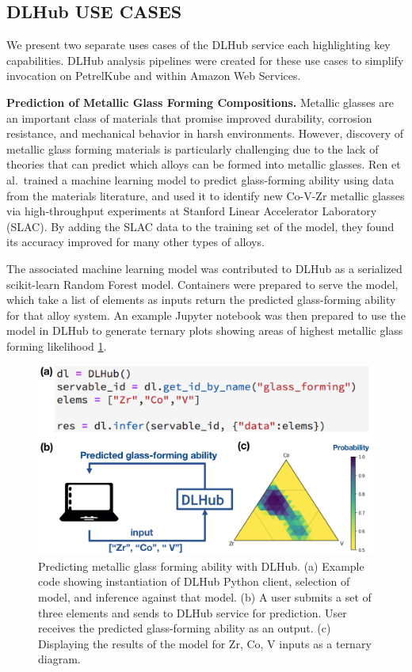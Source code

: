 \documentclass{aip-cp}
\begin{document}
\subsection{DLHub USE CASES}
We present two separate uses cases of the DLHub service each highlighting
key capabilities. DLHub analysis pipelines were created for these
use cases to simplify invocation on PetrelKube and within Amazon Web Services.

\textbf{Prediction of Metallic Glass Forming Compositions.}
Metallic glasses are an important class of materials that promise
improved durability, corrosion resistance, and mechanical behavior in harsh
environments. However, discovery of metallic glass forming materials is
particularly challenging due to the lack of theories that can predict which
alloys can be formed into metallic glasses. Ren et al.\ 
trained a machine learning model to predict glass-forming ability using data 
from the materials literature, and used it to identify new Co-V-Zr metallic glasses
via high-throughput experiments at Stanford Linear Accelerator
Laboratory (SLAC). By adding the SLAC data to the training set of the model,
they found its accuracy improved for many other types of alloys.

The associated machine learning model was contributed to DLHub as a
serialized scikit-learn Random Forest model. Containers were prepared to serve the
model, which take a list of elements as inputs return the predicted glass-forming ability
for that alloy system. An example Jupyter notebook was then prepared to use the model in DLHub 
to generate ternary plots showing areas of highest metallic glass forming likelihood \ref{fig:dlhub-glass}.

\begin{figure}[h]
  \centerline{\includegraphics[width=5in]{Figs/DLHub-metallic-glass.png}}
  \caption{Predicting metallic glass forming ability with DLHub. (a) Example code showing instantiation of DLHub Python client, selection of model, and inference against that model. (b) A user submits a set of three elements and sends to DLHub service for prediction. User receives the predicted glass-forming ability as an output. (c) Displaying the results of the model for Zr, Co, V inputs as a ternary diagram.
\label{fig:dlhub-glass}}
\end{figure}
\end{document}
